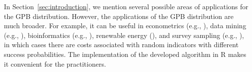 \documentclass[12pt]{article}
\begin{document}
In Section~\ref{sec:introduction}, we mention several possible areas of applications for the GPB distribution. However, the applications of the GPB distribution are much broader. For example, it can be useful in econometrics (e.g., ), data mining (e.g., ), bioinformatics (e.g., ), renewable energy (), and survey sampling (e.g., ), in which cases there are costs associated with random indicators with different success probabilities. The implementation of the developed algorithm in R makes it convenient for the practitioners.


\iffalse
\section*{Acknowledgments}
The authors thank the editor, an associate editor, and one referee, for their valuable comments on an earlier version of this manuscript which led to this improved one. The authors acknowledge Advanced Research Computing at Virginia Tech for providing computational resources. The work by Hong was partially supported by the National Science Foundation under Grant CNS-1565314 to Virginia Tech.
\fi



\appendix
\end{document}
